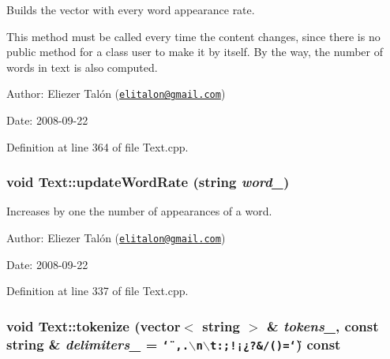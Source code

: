 Builds the vector with every word appearance rate. 

This method must be called every time the content changes, since there is no public method for a class user to make it by itself. By the way, the number of words in text is also computed.

\begin{Desc}
\item[Author:]Eliezer Talón (\href{mailto:elitalon@gmail.com}{\tt elitalon@gmail.com}) \end{Desc}
\begin{Desc}
\item[Date:]2008-09-22 \end{Desc}


Definition at line 364 of file Text.cpp.\hypertarget{class_text_7c2b1a540b470cb7aa37fb42070a674f}{
\subsubsection[updateWordRate]{\setlength{\rightskip}{0pt plus 5cm}void Text::updateWordRate (string {\em word\_\-})}}
\label{class_text_7c2b1a540b470cb7aa37fb42070a674f}


Increases by one the number of appearances of a word. 

\begin{Desc}
\item[Author:]Eliezer Talón (\href{mailto:elitalon@gmail.com}{\tt elitalon@gmail.com}) \end{Desc}
\begin{Desc}
\item[Date:]2008-09-22 \end{Desc}


Definition at line 337 of file Text.cpp.\hypertarget{class_text_09f6b1e475da423ac81305500e05c7d6}{
\subsubsection[tokenize]{\setlength{\rightskip}{0pt plus 5cm}void Text::tokenize (vector$<$ string $>$ \& {\em tokens\_\-}, \/  const string \& {\em delimiters\_\-} = {\tt \char`\"{}~,.$\backslash$n$\backslash$t:;!¡¿?\&/()=\char`\"{}}) const}}
\label{class_text_09f6b1e475da423ac81305500e05c7d6}


